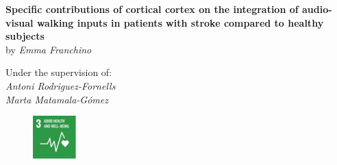 \begin{titlepage}
\vspace{15mm}
\begin{center}
  {\LARGE\textbf{Specific contributions of cortical cortex on the integration of audio-visual walking inputs in patients with stroke compared to healthy subjects}}
  \vspace{15mm}
  \\ {\Large{by \textit{Emma Franchino}}}
\end{center}
\vspace{17mm}

\begin{center}
  {\Large{{Under the supervision of:}\\ \textit{Antoni Rodriguez-Fornells \\ Marta Matamala-Gómez}}}
\end{center}

\vspace{4mm}
\begin{figure}[h]
    \centering
    \includegraphics[width=0.15\textwidth]{images/Picture 1.jpg}
\end{figure}

\end{titlepage}